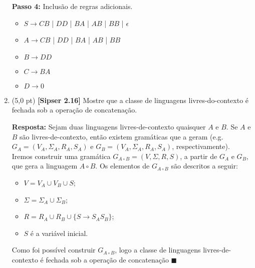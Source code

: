 \documentclass[12pt,a4paper,oneside]{article}
\begin{document}
\begin{enumerate}
{		{\bf Passo 4:} Inclusão de regras adicionais.
		\begin{itemize}
			\item[] $S \rightarrow CB$ | $DD$ | $BA$ | $AB$ | $BB$ | $\epsilon$
			\item[] $A \rightarrow CB$ | $DD$ | $BA$ | $AB$ | $BB$
			\item[] $B \rightarrow DD$
			\item[] $C \rightarrow BA$
			\item[] $D \rightarrow 0$
		\end{itemize}
	}
	
	\newpage
	
	\item (5,0 pt) {\bf [Sipser 2.16]}  Mostre que a classe de linguagens livres-do-contexto é fechada sob a operação de concatenação.
	
	\vspace*{0.3cm}
	
	{\color{blue} {\bf Resposta:} Sejam duas linguagens livres-de-contexto quaisquer $A$ e $B$. Se $A$ e $B$ são livres-de-contexto, então existem gramáticas que a geram (e.g. $G_A = (V_A, \Sigma_A, R_A, S_A)$ e $G_B = (V_A, \Sigma_A, R_A, S_A)$, respectivamente). Iremos construir uma gramática $G_{A \circ B} = (V, \Sigma, R, S)$, a partir de $G_A$ e $G_B$, que gera a linguagem $A \circ B$. Os elementos de $G_{A \circ B}$ são descritos a seguir:
		\begin{itemize}
			\item $V = V_A \cup V_B \cup S$;
			\item $\Sigma = \Sigma_A \cup \Sigma_B$;
			\item $R = R_A \cup R_B \cup \{S \rightarrow S_A S_B\}$;
			\item $S$ é a variável inicial.
		\end{itemize}
		Como foi possível construir $G_{A \circ B}$, logo a classe de linguagens livres-de-contexto é fechada sob a operação de concatenação $\blacksquare$
	}

\end{enumerate}
\end{document}
